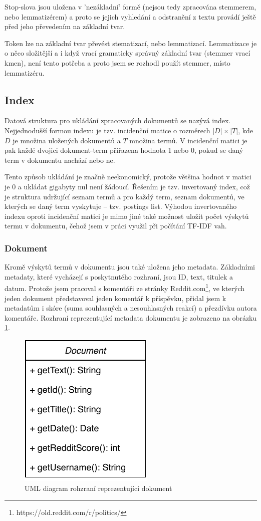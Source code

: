 \documentclass[11pt,a4paper]{scrartcl}
\begin{document}
	Stop-slova jsou uložena v 'nezákladní' formě (nejsou tedy zpracována stemmerem, nebo lemmatizérem) a proto se jejich vyhledání a odstranění z textu provádí ještě před jeho převedením na základní tvar.
	
	Token lze na základní tvar převést stematizací, nebo lemmatizací. Lemmatizace je o něco složitější a i když vrací gramaticky správný základní tvar (stemmer vrací kmen), není tento potřeba a proto jsem se rozhodl použít stemmer, místo lemmatizéru.
	
	\subsection{Index}
	Datová struktura pro ukládání zpracovaných dokumentů se nazývá index. Nejjednodušší formou indexu je tzv. incidenční matice o rozměrech $|D|\times|T|$, kde $D$ je množina uložených dokumentů a $T$ množina termů. V incidenční matici je pak každé dvojici dokument-term přiřazena hodnota 1 nebo 0, pokud se daný term v dokumentu nachází nebo ne. 
	 
	Tento způsob ukládání je značně neekonomický, protože většina hodnot v matici je 0 a ukládat gigabyty nul není žádoucí. Řešením je tzv. invertovaný index, což je struktura udržující seznam termů a pro každý term, seznam dokumentů, ve kterých se daný term vyskytuje -- tzv. postings list. Výhodou invertovaného indexu oproti incidenční matici je mimo jiné také možnost uložit počet výskytů termu v dokumentu, čehož jsem v práci využil při počítání TF-IDF vah.
	
	\subsubsection{Dokument}
	Kromě výskytů termů v dokumentu jsou také uložena jeho metadata. Základními metadaty, které vycházejí s poskytnutého rozhraní, jsou ID, text, titulek a datum. Protože jsem pracoval s komentáři ze stránky Reddit.com\footnote{https://old.reddit.com/r/politics/}, ve kterých jeden dokument představoval jeden komentář k příspěvku, přidal jsem k metadatům i skóre (suma souhlasných a nesouhlasných reakcí) a přezdívku autora komentáře. Rozhraní reprezentující metadata dokumentu je zobrazeno na obrázku \ref{fig:document-uml}.
	
	\begin{figure}[h]
		\centering
		\includegraphics[width=0.3\linewidth]{document-uml}
		\caption{UML diagram rohzraní reprezentující dokument}
		\label{fig:document-uml}
	\end{figure}
	
\end{document}
